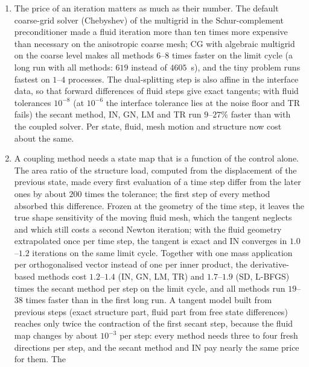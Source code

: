 \documentclass[11pt,a4paper]{article}
\theoremstyle{definition}
\theoremstyle{remark}
\begin{document}
\begin{enumerate}
IN), because the predictors do not reduce the tangent solves, which now make up two thirds of the
cost of the derivative-based methods. A stopping criterion on the cost that is looser than
$\tau_{\mathrm{rel}}=10^{-6}$ (larger tolerance, or reduction relative to the error of the
predictor) saves only $2$--$13\%$ once the predictors are in place.
\item The price of an iteration matters as much as their number. The default coarse-grid solver
(Chebyshev) of the multigrid in the Schur-complement preconditioner made a fluid iteration more than
ten times more expensive than necessary on the anisotropic coarse mesh; CG with algebraic
multigrid on the coarse level makes all methods $6$--$8$ times faster on the limit cycle (a long
run with all methods: $619$ instead of $4605$~s), and the tiny problem runs fastest on $1$--$4$
processes. The dual-splitting step is also affine in the interface data, so that forward
differences of fluid steps give exact tangents; with fluid tolerances $10^{-8}$ (at $10^{-6}$ the
interface tolerance lies at the noise floor and TR fails) the secant method, IN, GN, LM and TR run
$9$--$27\%$ faster than with the coupled solver. Per state, fluid, mesh motion and structure now
cost about the same.
\item A coupling method needs a state map that is a function of the control alone. The area ratio
of the structure load, computed from the displacement of the previous state, made every first
evaluation of a time step differ from the later ones by about $200$ times the tolerance; the first
step of every method absorbed this difference. Frozen at the geometry of the time step, it leaves
the true shape sensitivity of the moving fluid mesh, which the tangent neglects and which still
costs a second Newton iteration; with the fluid geometry extrapolated once per time step, the
tangent is exact and IN converges in $1.0$--$1.2$ iterations on the same limit cycle. Together with
one mass application per orthogonalised vector instead of one per inner product, the
derivative-based methods cost $1.2$--$1.4$ (IN, GN, LM, TR) and $1.7$--$1.9$ (SD, L-BFGS) times
the secant method per step on the limit cycle, and all methods run $19$--$38$ times faster than in
the first long run. A tangent model built from previous steps (exact structure part, fluid part
from free state differences) reaches only twice the contraction of the first secant step, because
the fluid map changes by about $10^{-3}$ per step: every method needs three to four fresh
directions per step, and the secant method and IN pay nearly the same price for them. The

\end{enumerate}
\end{document}
